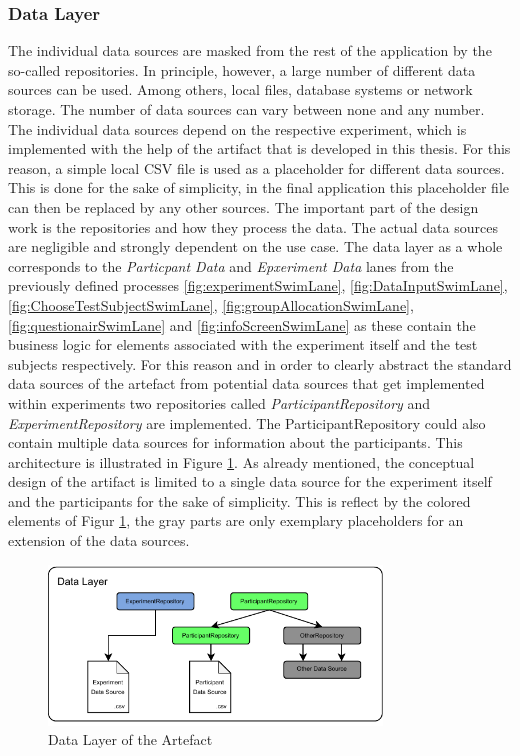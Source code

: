 \subsubsection{Data Layer}

The individual data sources are masked from the rest of the application by the so-called repositories. In principle, however, a large number of different data sources can be used. Among others, local files, database systems or network storage.  The number of data sources can vary between none and any number. The individual data sources depend on the respective experiment, which is implemented with the help of the artifact that is developed in this thesis. For this reason, a simple local CSV file is used as a placeholder for different data sources. This is done for the sake of simplicity, in the final application this placeholder file can then be replaced by any other sources. The important part of the design work is the repositories and how they process the data. The actual data sources are negligible and strongly dependent on the use case. The data layer as a whole corresponds to the \textit{Particpant Data} and \textit{Epxeriment Data} lanes from the previously defined processes \ref{fig:experimentSwimLane}, \ref{fig:DataInputSwimLane}, \ref{fig:ChooseTestSubjectSwimLane}, \ref{fig:groupAllocationSwimLane}, \ref{fig:questionairSwimLane} and \ref{fig:infoScreenSwimLane} as these contain the business logic for elements associated with the experiment itself and the test subjects respectively. For this reason and in order to clearly abstract the standard data sources of the artefact from potential data sources that get implemented within experiments two repositories called \textit{ParticipantRepository} and \textit{ExperimentRepository} are implemented. The ParticipantRepository could also contain multiple data sources for information about the participants. This architecture is illustrated in Figure \ref{fig:dataLayer}. As already mentioned, the conceptual design of the artifact is limited to a single data source for the experiment itself and the participants for the sake of simplicity. This is reflect by the colored elements of Figur \ref{fig:dataLayer}, the gray parts are only exemplary placeholders for an extension of the data sources.

\begin{figure}[htbp]
    \centering
    \includegraphics[width=0.79\textwidth, keepaspectratio]{content/05_design_and_dev_artefacts/DataLayer.drawio.pdf}
    \caption{Data Layer of the Artefact}    
    \label{fig:dataLayer}
\end{figure}

